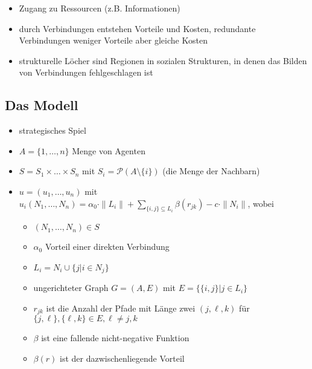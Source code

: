 \begin{itemize}
	\item Zugang zu Ressourcen (z.B. Informationen)
	\item durch Verbindungen entstehen Vorteile und Kosten, redundante Verbindungen weniger Vorteile aber gleiche Kosten
	\item strukturelle Löcher sind Regionen in sozialen Strukturen, in denen das Bilden von Verbindungen fehlgeschlagen ist
\end{itemize}
\subsection{Das Modell}
	\begin{itemize}
		\item strategisches Spiel
		\item $A=\{1,\dots,n\}$ Menge von Agenten
		\item $S=S_1\times\dots\times S_n$ mit $S_i=\mathcal{P}(A\setminus\{i\})$ (die Menge der Nachbarn)
		\item $u=(u_1,\dots,u_n)$ mit $u_i(N_1,\dots,N_n)=\alpha_0\cdot\|L_i\|+\sum\limits_{\{i,j\}\subseteq L_i}\beta(r_{jk})-c\cdot \|N_i\|$, wobei
			\begin{itemize}
				\item $(N_1,\dots,N_n)\in S$
				\item $\alpha_0$ Vorteil einer direkten Verbindung
				\item $L_i=N_i\cup\{j|i\in N_j\}$
				\item ungerichteter Graph $G=(A,E)$ mit $E=\{\{i,j\}|j\in L_i\}$
				\item $r_{jk}$ ist die Anzahl der Pfade mit Länge zwei $(j,\ell,k)$ für $\{j,\ell\},\{\ell,k\}\in E,\ell\neq j,k$
				\item $\beta$ ist eine fallende nicht-negative Funktion
				\item $\beta(r)$ ist der dazwischenliegende Vorteil
			\end{itemize}
	\end{itemize}
